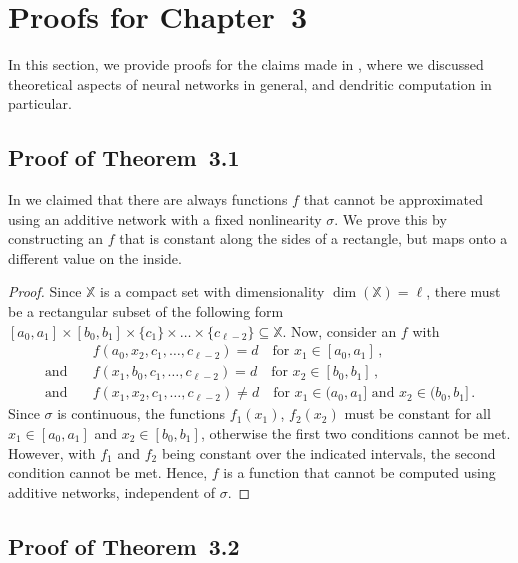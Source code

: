 
\section{Proofs for Chapter~3}
\label{app:neural_network_proofs}

In this section, we provide proofs for the claims made in , where we discussed theoretical aspects of neural networks in general, and dendritic computation in particular.

\subsection{Proof of Theorem~3.1}

In  we claimed that there are always functions $f$ that cannot be approximated using an additive network with a fixed nonlinearity $\sigma$.
We prove this by constructing an $f$ that is constant along the sides of a rectangle, but maps onto a different value on the inside.

\ThmXorGeneral*

\begin{proof}
Since $\mathbb{X}$ is a compact set with dimensionality $\dim(\mathbb{X}) = \ell$, there must be a rectangular subset of the following form
$[a_0, a_1] \times [b_0, b_1] \times \{c_1\} \times \ldots \times \{c_{\ell - 2}\} \subseteq \mathbb{X}$.
Now, consider an $f$ with
\begin{align*}
				     &f(a_0, x_2, c_1, \ldots, c_{\ell - 2}) = d \quad \text{for } x_1 \in [a_0, a_1] \,, \\
	\text{and} \quad &f(x_1, b_0, c_1, \ldots, c_{\ell - 2}) = d \quad \text{for } x_2 \in [b_0, b_1] \,, \\
	\text{and} \quad &f(x_1, x_2, c_1, \ldots, c_{\ell - 2}) \neq d \quad \text{for } x_1 \in (a_0, a_1] \text{ and } x_2 \in (b_0, b_1] \,.
\end{align*}
Since $\sigma$ is continuous, the functions $f_1(x_1)$, $f_2(x_2)$ must be constant for all $x_1 \in [a_0, a_1]$ and $x_2 \in [b_0, b_1]$, otherwise the first two conditions cannot be met.
However, with $f_1$ and $f_2$ being constant over the indicated intervals, the second condition cannot be met. Hence, $f$ is a function that cannot be computed using additive networks, independent of $\sigma$.
\end{proof}

\subsection{Proof of Theorem~3.2}
\label{app:thm_weak_xor}

